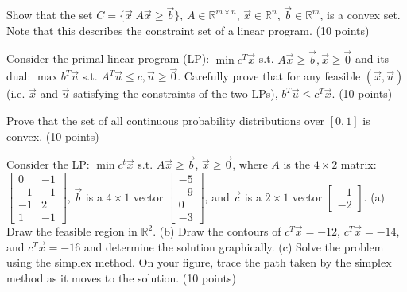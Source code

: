 \documentclass[fleqn]{homework}
\begin{document}
  \begin{problem}{2}
    \begin{question}
      Show that the set $C=\{\vec{x}|A\vec{x} \geq \vec{b}\}$,
      $A \in \mathbb{R}^{m \times n}$, $\vec{x} \in \mathbb{R}^n$,
      $\vec{b} \in \mathbb{R}^m$, is a convex set.  Note that this describes the
      constraint set of a linear program. (10 points)
    \end{question}
  \end{problem}

  \begin{problem}{3}
    \begin{question}
      Consider the primal linear program (LP): $\min c^T \vec{x}$ s.t.
      $A\vec{x} \geq \vec{b}, \vec{x} \geq \vec{0}$ and its dual:
      $\max b^T \vec{u}$ s.t. $A^T \vec{u} \leq c, \vec{u} \geq \vec{0}$.
      Carefully prove that for any feasible $(\vec{x},\vec{u})$ (i.e. $\vec{x}$
      and $\vec{u}$ satisfying the constraints of the two LPs),
      $b^T \vec{u} \leq c^T \vec{x}$. (10 points)
    \end{question}
  \end{problem}

  \begin{problem}{4}
    \begin{question}
      Prove that the set of all continuous probability distributions over
      $[0,1]$ is convex. (10 points)
    \end{question}
  \end{problem}

  \begin{problem}{5}
    \begin{question}
      Consider the LP: $\min c^t \vec{x}$ s.t. $A\vec{x} \geq \vec{b}$,
      $\vec{x} \geq \vec{0}$, where $A$ is the $4 \times 2$ matrix:
      $\begin{bmatrix*} 0 & -1 \\ -1 & -1 \\ -1 & 2 \\ 1 & -1 \end{bmatrix*}$,
      $\vec{b}$ is a $4 \times 1$ vector
      $\begin{bmatrix*} -5 \\ -9 \\ 0 \\ -3 \end{bmatrix*}$, and $\vec{c}$ is a
      $2 \times 1$ vector $\begin{bmatrix*} -1 \\ -2 \end{bmatrix*}$.  (a) Draw
      the feasible region in $\mathbb{R}^2$.  (b) Draw the contours of
      $c^T \vec{x} = -12$, $c^T \vec{x} = -14$, and $c^T \vec{x} = -16$ and
      determine the solution graphically.  (c) Solve the problem using the
      simplex method.  On your figure, trace the path taken by the simplex
      method as it moves to the solution. (10 points)
    \end{question}
  \end{problem}
\end{document}
